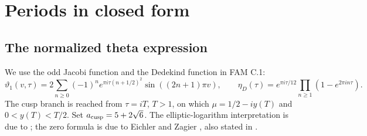 \section{Periods in closed form}\label{sec:periods}
\subsection{The normalized theta expression}
We use the odd Jacobi function and the Dedekind function in FAM C.1:
\[
\vartheta_1(v,\tau)=2\sum_{n\ge0}(-1)^n e^{\pi i\tau(n+1/2)^2}\sin((2n+1)\pi v),\qquad
\eta_D(\tau)=e^{\pi i\tau/12}\prod_{n\ge1}(1-e^{2\pi in\tau}).
\]
The cusp branch is reached from $\tau=iT$, $T>1$, on which $\mu=1/2-iy(T)$ and $0<y(T)<T/2$.
Set $a_{\rm cusp}=5+2\sqrt6$. The elliptic-logarithm interpretation is due to \cite[Remark~3.12]{AC26}; the zero formula is due to Eichler and Zagier \cite[unnumbered theorem, p.~399]{EZ82}, also stated in \cite[§2, equation~(6)]{DI10}.

